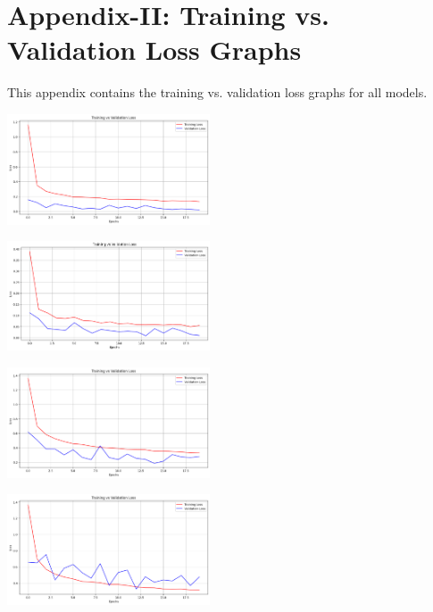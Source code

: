 \chapter*{Appendix-II: Training vs. Validation Loss Graphs}

\noindent This appendix contains the training vs. validation loss graphs for all models.

\begin{multicols}{2}
\centering

\setcounter{figure}{0} %
\renewcommand{\thefigure}{2.\arabic{figure}} %

\includegraphics[width=0.45\textwidth]{Assets/validation_loss/vgg19.png}

\vspace{0.5cm}

\includegraphics[width=0.45\textwidth]{Assets/validation_loss/CONVNEXTBASE.png}

\vspace{0.5cm}

\includegraphics[width=0.45\textwidth]{Assets/validation_loss/DENSENET121.png}

\vspace{0.5cm}

\includegraphics[width=0.45\textwidth]{Assets/validation_loss/DenseNet169.png}


\end{multicols}
